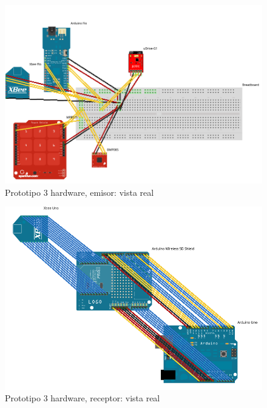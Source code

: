   \begin{figure}[htbp]
   \centering
   \includegraphics[scale=0.55,keepaspectratio=true]{./imagenes/prototipo3_bb_1.png}
   \caption{Prototipo 3 hardware, emisor: vista real}
   \label{figura:Prototipo3HardwareBB1}
  \end{figure}

  \begin{figure}[htbp]
   \centering
   \includegraphics[scale=0.55,keepaspectratio=true]{./imagenes/prototipo3_bb_2.png}
   \caption{Prototipo 3 hardware, receptor: vista real}
   \label{figura:Prototipo3HardwareBB2}
  \end{figure}

